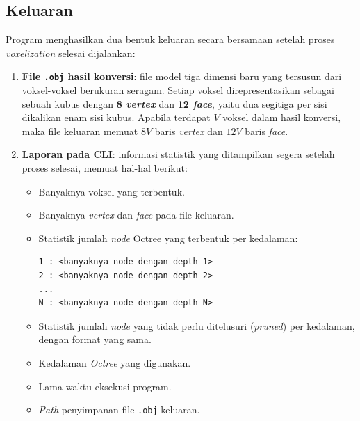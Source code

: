 \subsection{Keluaran}

Program menghasilkan dua bentuk keluaran secara bersamaan setelah proses
\textit{voxelization} selesai dijalankan:

\begin{enumerate}
    \item \textbf{File \texttt{.obj} hasil konversi}: file model tiga dimensi
    baru yang tersusun dari voksel-voksel berukuran seragam. Setiap voksel
    direpresentasikan sebagai sebuah kubus dengan \textbf{8 \textit{vertex}} dan
    \textbf{12 \textit{face}}, yaitu dua segitiga per sisi dikalikan enam sisi
    kubus. Apabila terdapat $V$ voksel dalam hasil konversi, maka file keluaran
    memuat $8V$ baris \textit{vertex} dan $12V$ baris \textit{face}.

    \item \textbf{Laporan pada CLI}: informasi statistik yang ditampilkan segera
    setelah proses selesai, memuat hal-hal berikut:
    \begin{itemize}
        \item Banyaknya voksel yang terbentuk.
        \item Banyaknya \textit{vertex} dan \textit{face} pada file keluaran.
        \item Statistik jumlah \textit{node} Octree yang terbentuk per kedalaman:
        \begin{verbatim}
1 : <banyaknya node dengan depth 1>
2 : <banyaknya node dengan depth 2>
...
N : <banyaknya node dengan depth N>
        \end{verbatim}
        \item Statistik jumlah \textit{node} yang tidak perlu ditelusuri
        (\textit{pruned}) per kedalaman, dengan format yang sama.
        \item Kedalaman \textit{Octree} yang digunakan.
        \item Lama waktu eksekusi program.
        \item \textit{Path} penyimpanan file \texttt{.obj} keluaran.
    \end{itemize}
\end{enumerate}
